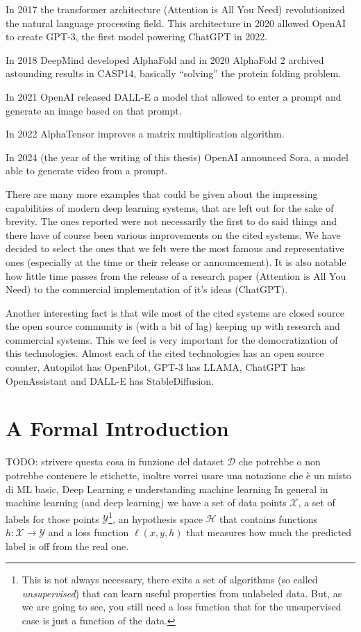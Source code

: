 \documentclass{report}
\newcommand{\TODO}[1]{TODO: #1}
\begin{document}
In 2017 the transformer architecture (Attention is All You Need) revolutionized
the natural language processing field. This architecture in 2020 allowed OpenAI
to create GPT-3, the first model powering ChatGPT in 2022.

In 2018 DeepMind developed AlphaFold and in 2020 AlphaFold 2 archived astounding
results in CASP14, basically ``solving'' the protein folding problem.

In 2021 OpenAI released DALL-E a model that allowed to enter a prompt and
generate an image based on that prompt.

In 2022 AlphaTensor improves a matrix multiplication algorithm.

In 2024 (the year of the writing of this thesis) OpenAI announced Sora, a model
able to generate video from a prompt.

There are many more examples that could be given about the impressing
capabilities of modern deep learning systems, that are left out for the sake of
brevity. The ones reported were not necessarily the first to do said things and
there have of course been various improvements on the cited systems. We have
decided to select the ones that we felt were the most famous and representative
ones (especially at the time or their release or announcement). It is also
notable how little time passes from the release of a research paper
(Attention is All You Need) to the commercial implementation of it's ideas
(ChatGPT).

Another interesting fact is that wile most of the cited systems are closed
source the open source community is (with a bit of lag) keeping up with
research and commercial systems. This we feel is very important for the
democratization of this technologies. Almost each of the cited technologies has
an open source counter, Autopilot has OpenPilot, GPT-3 has LLAMA, ChatGPT has
OpenAssistant and DALL-E has StableDiffusion.

\section{A Formal Introduction}

\TODO{strivere questa cosa in funzione del dataset $\mathcal D$ che potrebbe o
non potrebbe contenere le etichette, inoltre vorrei usare una notazione che è un
misto di ML basic, Deep Learning e understanding machine learning}
In general in machine learning (and deep learning)  we have a set of data points
$\mathcal X$, a set of labels for those points $\mathcal Y$\footnote{This is
not always necessary, there exits a set of algorithms (so called \emph
{unsupervised}) that can learn useful properties from unlabeled data. But, as
we are going to see, you still need a loss function that for the unsupervised
case is just a function of the data.}, an hypothesis space $\mathcal H$ that
contains functions $h : \mathcal X \to \mathcal Y$ and a loss function $\ell
(x, y, h)$ that measures how much the predicted label is off from the real
one.
\end{document}
